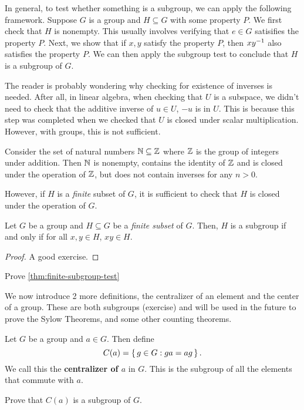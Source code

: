 \documentclass[./algebra-notes.tex]{subfiles}
\begin{document}
In general, to test whether something is a subgroup, we can apply the following
framework. Suppose $G$ is a group and $H \subseteq G$ with some property $P$. We
first check that $H$ is nonempty. This usually involves verifying that $e \in G$
satisifies the property $P$. Next, we show that if $x, y$ satisfy the property
$P$, then $xy^{-1}$ also satisfies the property $P$. We can then apply the
subgroup test to conclude that $H$ is a subgroup of $G$. 

The reader is probably wondering why checking for existence of inverses is
needed. After all, in linear algebra, when checking that $U$ is a subspace, we
didn't need to check that the additive inverse of $u \in U$, $-u$ is in $U$.
This is because this step was completed when we checked that $U$ is closed under
scalar multiplication. However, with groups, this is not sufficient.

\begin{example}
Consider the set of natural numbers $\mathbb{N} \subseteq \mathbb{Z}$ where $\mathbb{Z}$ is
the group of integers under addition. Then $\mathbb{N}$ is nonempty, contains the
identity of $\mathbb{Z}$ and is closed under the operation of $\mathbb{Z}$, but does not
contain inverses for any $n > 0$.
\end{example}

However, if $H$ is a \emph{finite} subset of $G$, it is sufficient to check that
$H$ is closed under the operation of $G$. 
\begin{theorem}
\label{thm:finite-subgroup-test}
    Let $G$ be a group and $H \subseteq G$ be a \emph{finite subset} of $G$.
    Then, $H$ is a subgroup if and only if for all $x,y \in H$, $xy \in H$.
\end{theorem}
\begin{proof}
    A good exercise.
\end{proof}
\begin{exercise}
    Prove \cref{thm:finite-subgroup-test}
\end{exercise}

We now introduce 2 more definitions, the centralizer of an element and the
center of a group. These are both subgroups (exercise) and will be used in the
future to prove the Sylow Theorems, and some other counting theorems.

\begin{definition}[Centralizer]
    Let $G$ be a group and $a \in G$. Then define 
    \[
        C(a) = \set{g \in G: ga=ag}.
    \]
    We call this the \textbf{centralizer of $a$} in $G$. This is the subgroup of
    all the elements that commute with $a$. 
\end{definition}
\begin{exercise}
    Prove that $C(a)$ is a subgroup of $G$. 
\end{exercise}
\end{document}
